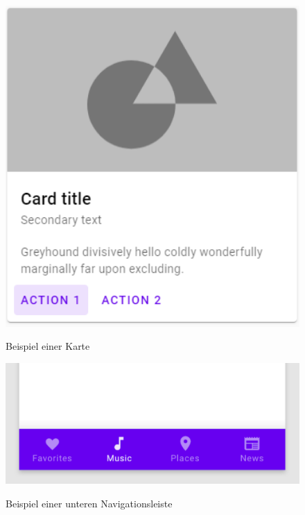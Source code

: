 \begin{figure}[hbt]
    \centering
    \begin{minipage}[t]{.9\textwidth}
        \caption[]{Beispiel einer Karte}
        \includegraphics[width=1\textwidth]{img/Material_Card_Example.PNG}\\
        \label{fig:material_card_example}
    \end{minipage}
\end{figure}

\begin{figure}[hbt]
    \centering
    \begin{minipage}[t]{.98\textwidth}
        \caption[]{Beispiel einer unteren Navigationsleiste}
        \includegraphics[width=1\textwidth]{img/Material_Bottom_Nav.PNG}\\
        \label{fig:material_bottom_nav_example}
    \end{minipage}
\end{figure}

